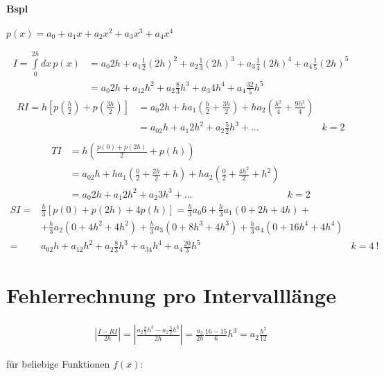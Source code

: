 \documentclass[a4paper,ngerman]{scrbook}
\begin{document}
\paragraph{Bspl}

$p(x) = a_0 + a_1x+a_2x^2 + a_3x^3 + a_4x^4$

\begin{align*}
  I = \int\limits_0^{2h} dx\, p(x) &= a_0 2h + a_1\frac{1}{2}(2h)^2 +   a_2 \frac{1}{3}(2h)^3 + a_3\frac{1}{4}(2h)^4+a_4\frac{1}{5}(2h)^5\\
 &= a_0 2h + a_12h^2 + a_2 \frac{8}{3} h^3 +a_3 4h^4 + a_4\frac{32}{5}h^5
\end{align*}
\begin{align*}
RI = h\left[ p\left(\frac{h}{2}\right) + p\left(\frac{3h}{2}\right)\right] &= a_0 2h +ha_1 \left(\frac{h}{2} + \frac{3h}{2}\right) + ha_2\left(\frac{h^2}{4} + \frac{9h^2}{4}\right)\\
&= a_02h + a_1 2h^2 + a_2 \frac{5}{2}h^3+\dots & k=2\\
\end{align*}
\begin{align*}
  TI &= h\left(\frac{p(0) + p(2h)}{2} + p(h)\right)\\
  &= a_02h + ha_1\left( \frac{0}{2} + \frac{2h}{2} + h \right) +     ha_2\left( \frac{0}{2} + \frac{4h^2}{2} + h^2 \right)\\
&= a_0 2h + a_1 2h^2 + a_2 3h^3 + \dots & k=2
\end{align*}
\begin{align*}
  SI =& \frac{h}{3} \left[ p(0) + p(2h) + 4p(h) \right] = \frac{h}{3} a_0 6 + \frac{h}{3}a_1(0+2h+4h)+\\
&+ \frac{h}{3}a_2(0 + 4h^2 + 4h^2) + \frac{h}{3}a_3(0+8h^3+4h^3)+\frac{h}{3}a_4(0+16h^4+4h^4)\\
=& a_02h + a_12h^2 + a_2 \frac{8}{3}h^3 +a_34h^4 + a_4\frac{20}{3}h^5 & k=4\ !
\end{align*}

\section*{Fehlerrechnung pro Intervalllänge}

\begin{align*}
  \left|\frac{I-RI}{2h}\right| = \left| \frac{a_2 \frac{8}{2}h^3 -a_2\frac{5}{2}h^3}{2h} \right| = \frac{a_2}{2h} \frac{16-15}{6}h^3 = a_2 \frac{h^2}{12}
\end{align*}

für beliebige Funktionen $f(x)$:
\end{document}
